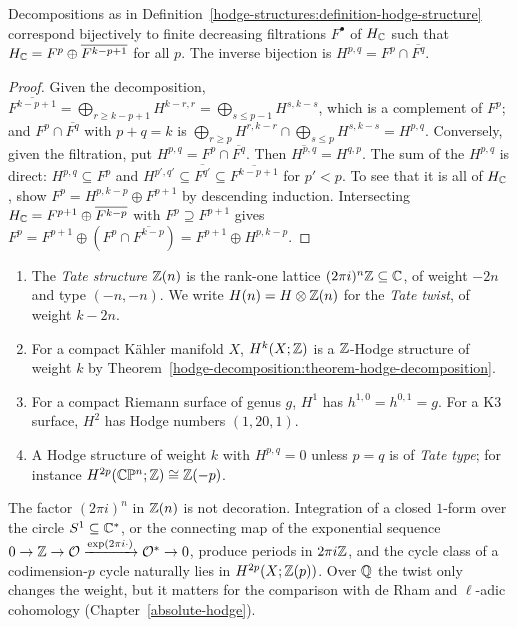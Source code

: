 \begin{proposition}\label{hodge-structures:proposition-filtration}
Decompositions as in Definition~\ref{hodge-structures:definition-hodge-structure} correspond bijectively to finite decreasing filtrations $F^\bullet$ of $H_{\mathbb{C}}$ such that
$H_{\mathbb{C}} = F^p \oplus \overline{F^{k-p+1}}$ for all $p$. The inverse bijection is $H^{p,q} = F^p \cap \overline{F^q}$.
\end{proposition}

\begin{proof}
Given the decomposition, $\overline{F^{k-p+1}} = \bigoplus_{r \geq k-p+1}H^{k-r,r} = \bigoplus_{s \leq p-1}H^{s,k-s}$, which is a complement of $F^p$; and $F^p \cap \overline{F^q}$ with $p + q = k$ is
$\bigoplus_{r \geq p}H^{r,k-r} \cap \bigoplus_{s \leq p}H^{s,k-s} = H^{p,q}$. Conversely, given the filtration, put $H^{p,q} = F^p \cap \overline{F^q}$. Then
$\overline{H^{p,q}} = H^{q,p}$. The sum of the $H^{p,q}$ is direct: $H^{p,q} \subseteq F^p$ and $H^{p',q'} \subseteq \overline{F^{q'}} \subseteq \overline{F^{k-p+1}}$ for $p' < p$. To see
that it is all of $H_{\mathbb{C}}$, show $F^p = H^{p,k-p} \oplus F^{p+1}$ by descending induction. Intersecting $H_{\mathbb{C}} = F^{p+1} \oplus \overline{F^{k-p}}$ with $F^p \supseteq F^{p+1}$ gives
$F^p = F^{p+1} \oplus (F^p \cap \overline{F^{k-p}}) = F^{p+1} \oplus H^{p,k-p}$.
\end{proof}

\begin{example}\label{hodge-structures:example-hodge-structures}
\begin{enumerate}
\item The \emph{Tate structure} $\mathbb{Z}(n)$ is the rank-one lattice $(2\pi i)^n\mathbb{Z} \subseteq \mathbb{C}$, of weight $-2n$ and type $(-n, -n)$. We write $H(n) = H \otimes \mathbb{Z}(n)$ for the
\emph{Tate twist}, of weight $k - 2n$.
\item For a compact K\"ahler manifold $X$, $H^k(X; \mathbb{Z})$ is a $\mathbb{Z}$-Hodge structure of weight $k$ by Theorem~\ref{hodge-decomposition:theorem-hodge-decomposition}.
\item For a compact Riemann surface of genus $g$, $H^1$ has $h^{1,0} = h^{0,1} = g$. For a K3 surface, $H^2$ has Hodge numbers $(1, 20, 1)$.
\item A Hodge structure of weight $k$ with $H^{p,q} = 0$ unless $p = q$ is of \emph{Tate type}; for instance $H^{2p}(\mathbb{C}\mathbb{P}^n; \mathbb{Z}) \cong \mathbb{Z}(-p)$.
\end{enumerate}
\end{example}

\begin{remark}\label{hodge-structures:remark-tate-normalisation}
The factor $(2\pi i)^n$ in $\mathbb{Z}(n)$ is not decoration. Integration of a closed $1$-form over the circle $S^1 \subseteq \mathbb{C}^*$, or the connecting map of the exponential sequence
$0 \to \mathbb{Z} \to \mathcal{O} \xrightarrow{\exp(2\pi i\cdot)} \mathcal{O}^* \to 0$, produce periods in $2\pi i\mathbb{Z}$, and the cycle class of a codimension-$p$ cycle naturally lies in
$H^{2p}(X; \mathbb{Z}(p))$. Over $\mathbb{Q}$ the twist only changes the weight, but it matters for the comparison with de Rham and $\ell$-adic cohomology (Chapter~\ref{absolute-hodge}).
\end{remark}

